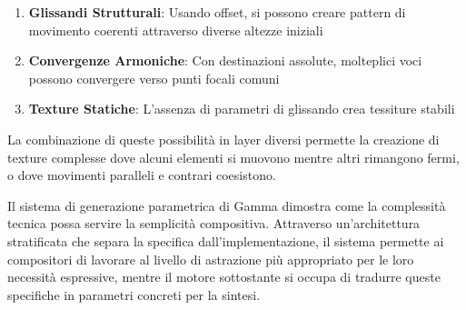 \begin{enumerate}
    \item \textbf{Glissandi Strutturali}: Usando offset, si possono creare pattern di movimento coerenti attraverso diverse altezze iniziali
    \item \textbf{Convergenze Armoniche}: Con destinazioni assolute, molteplici voci possono convergere verso punti focali comuni
    \item \textbf{Texture Statiche}: L'assenza di parametri di glissando crea tessiture stabili
\end{enumerate}

La combinazione di queste possibilità in layer diversi permette la creazione di texture complesse dove alcuni elementi si muovono mentre altri rimangono fermi, o dove movimenti paralleli e contrari coesistono.

Il sistema di generazione parametrica di Gamma dimostra come la complessità tecnica possa servire la semplicità compositiva. Attraverso un'architettura stratificata che separa la specifica dall'implementazione, il sistema permette ai compositori di lavorare al livello di astrazione più appropriato per le loro necessità espressive, mentre il motore sottostante si occupa di tradurre queste specifiche in parametri concreti per la sintesi.
